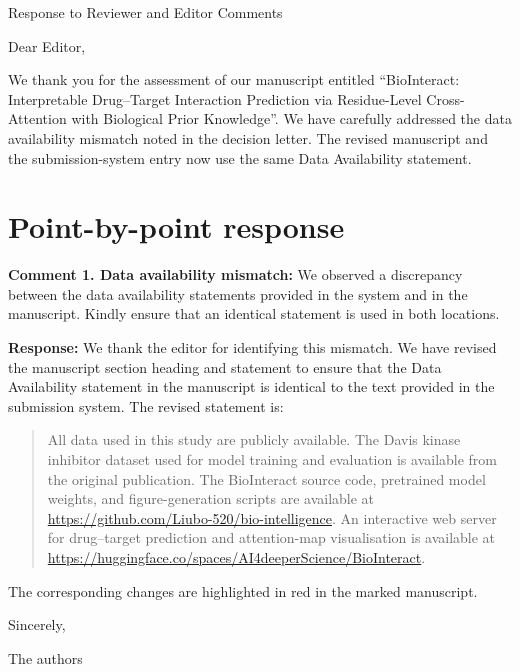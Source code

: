 \documentclass[11pt]{article}
\begin{document}
\begin{center}
{\Large Response to Reviewer and Editor Comments}
\end{center}

\noindent Dear Editor,

\medskip

\noindent We thank you for the assessment of our manuscript entitled
``BioInteract: Interpretable Drug--Target Interaction Prediction via
Residue-Level Cross-Attention with Biological Prior Knowledge''. We have
carefully addressed the data availability mismatch noted in the decision letter.
The revised manuscript and the submission-system entry now use the same Data
Availability statement.

\section*{Point-by-point response}

\noindent\textbf{Comment 1. Data availability mismatch:} We observed a
discrepancy between the data availability statements provided in the system and
in the manuscript. Kindly ensure that an identical statement is used in both
locations.

\medskip

\noindent\textbf{Response:} We thank the editor for identifying this mismatch.
We have revised the manuscript section heading and statement to ensure that the
Data Availability statement in the manuscript is identical to the text provided
in the submission system. The revised statement is:

\begin{quote}
All data used in this study are publicly available. The Davis kinase inhibitor
dataset used for model training and evaluation is available from the original
publication. The BioInteract source code, pretrained model weights, and
figure-generation scripts are available at
\url{https://github.com/Liubo-520/bio-intelligence}. An interactive web
server for drug--target prediction and attention-map visualisation is available
at \url{https://huggingface.co/spaces/AI4deeperScience/BioInteract}.
\end{quote}

\noindent The corresponding changes are highlighted in red in the marked
manuscript.

\medskip

\noindent Sincerely,

\medskip

\noindent The authors
\end{document}
